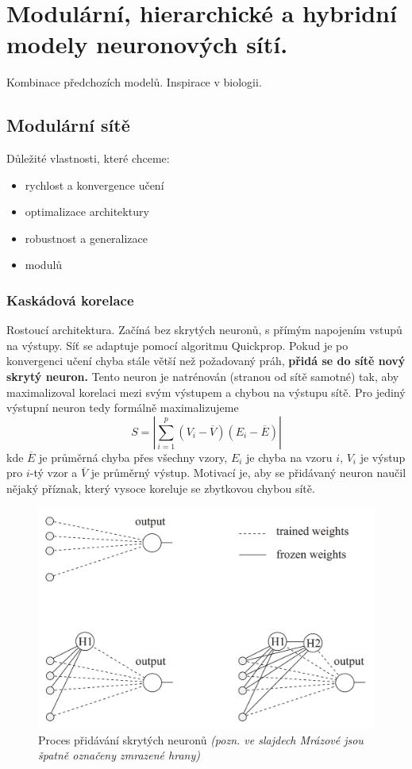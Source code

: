 \documentclass[11pt]{report} %
\numberwithin{equation}{section}
\begin{document}
\section{Modulární, hierarchické a hybridní modely neuronových sítí.}
Kombinace předchozích modelů. Inspirace v biologii.

\subsection{Modulární sítě}
Důležité vlastnosti, které chceme:
\begin{itemize}
	\item rychlost a konvergence učení
	\item optimalizace architektury
	\item robustnost a generalizace
	\item {} modulů
\end{itemize}
\subsubsection{Kaskádová korelace}
Rostoucí architektura. Začíná bez skrytých neuronů, s přímým napojením vstupů na výstupy. Síť se adaptuje pomocí algoritmu Quickprop. Pokud je po konvergenci učení chyba stále větší než požadovaný práh, \textbf{přidá se do sítě nový skrytý neuron.} Tento neuron je natrénován (stranou od sítě samotné) tak, aby maximalizoval korelaci mezi svým výstupem a chybou na výstupu sítě. Pro jediný výstupní neuron tedy formálně maximalizujeme 
$$S = |\sum_{i=1}^{p}(V_i - \overline{V})(E_i - \overline{E})|$$
kde $\overline{E}$ je průměrná chyba přes všechny vzory, $E_i$ je chyba na vzoru $i$, $V_i$ je výstup pro $i$-tý vzor a $\overline{V}$ je průměrný výstup. Motivací je, aby se přidávaný neuron naučil nějaký příznak, který vysoce koreluje se zbytkovou chybou sítě.

\begin{figure}[H]
	\centering
	\includegraphics[scale=1]{img/cascade.png}
	\caption{Proces přidávání skrytých neuronů \textit{(pozn. ve slajdech Mrázové jsou špatně označeny zmrazené hrany)}}
\end{figure}
\end{document}
